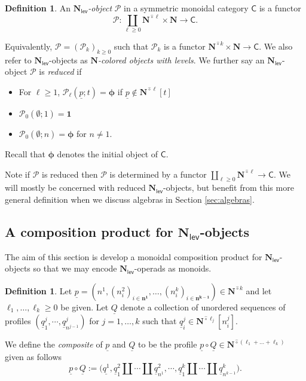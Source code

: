 \documentclass[11pt]{amsart}
\theoremstyle{definition}
\newtheorem{definition}[subsection]{Definition}
\theoremstyle{remark}
\newcommand{\Cal}[1]{\mathcal{#1}}
\newcommand{\Ncirc}[1]{\mathbf{N}^{\hat{\circ}#1}}
\newcommand{\Nl}{\mathbf{N}_{\mathsf{lev}}}
\newcommand{\ptC}{\pmb{\phi}}
\begin{document}
\begin{definition} 
An \textit{$\Nl$-object} $\mathcal{P}$ in a symmetric monoidal category $\mathsf{C}$ is a functor \[ \Cal{P}\colon \coprod_{\ell\geq 0} \Ncirc{\ell}\times \mathbf{N} \to \mathsf{C}.\] 

Equivalently, $\mathcal{P}=(\mathcal{P}_{k})_{k\geq 0}$ such that $\mathcal{P}_{k}$ is a functor $\Ncirc{k}\times \mathbf{N} \to \mathsf{C}$. We also refer to $\Nl$-objects as \textit{$\mathbf{N}$-colored objects with levels}. 
We further say an $\Nl$-object $\Cal{P}$ is \textit{reduced} if \begin{itemize}
    \item For $\ell\geq 1$, $\Cal{P}_{\ell}(\underline{p};t)= \ptC$ if $\underline{p}\notin \Ncirc{\ell}[t]$
    \item $\Cal{P}_0(\emptyset;1)=\mathbf{1}$ 
    \item $\Cal{P}_0(\emptyset; n)=\ptC$ for $n\neq 1$. 
\end{itemize} 
Recall that $\ptC$ denotes the initial object of $\mathsf{C}$.
\end{definition}
Note if $\Cal{P}$ is reduced then $\Cal{P}$ is determined by a functor $\coprod_{\ell\geq 0} \Ncirc{\ell} \to \mathsf{C}$. We will mostly be concerned with reduced $\Nl$-objects, but benefit from this more general definition when we discuss algebras in Section \ref{sec:algebras}.

\subsection{A composition product for $\Nl$-objects}
The aim of this section is develop a monoidal composition product for $\Nl$-objects so that we may encode $\Nl$-operads as monoids. 

\begin{definition}
\label{circ-dot-composite}
Let $\underline{p}=(n^1,(n^2_i)_{i\in\mathbf{n^1}},\dots,(n^k_i)_{i\in\mathbf{n^{k-1}}}) \in \Ncirc{k}$ and let $\ell_1,\dots,\ell_k\geq 0$ be given. Let $\underline{Q}$ denote a collection of unordered sequences of profiles $(\underline{q}_1^j,\cdots, \underline{q}^j_{n^{j-1}})$ for $j=1,\dots,k$ such that $\underline{q}^j_i\in\Ncirc{\ell_j}[n^j_i]$. 

We define the \textit{composite} of $\underline{p}$ and $\underline{Q}$ to be the profile $\underline{p}\circ \underline{Q}\in\Ncirc{(\ell_1+\dots+\ell_k)}$ given as follows \[\underline{p}\circ \underline{Q}:=\big(\underline{q^1}, \underline{q}^2_1\amalg \cdots \amalg \underline{q}^2_{n^1}, \cdots, \underline{q}_1^k\amalg \cdots \amalg \underline{q}_{n^{k-1}}^k\big).\]
\end{definition}
\end{document}
